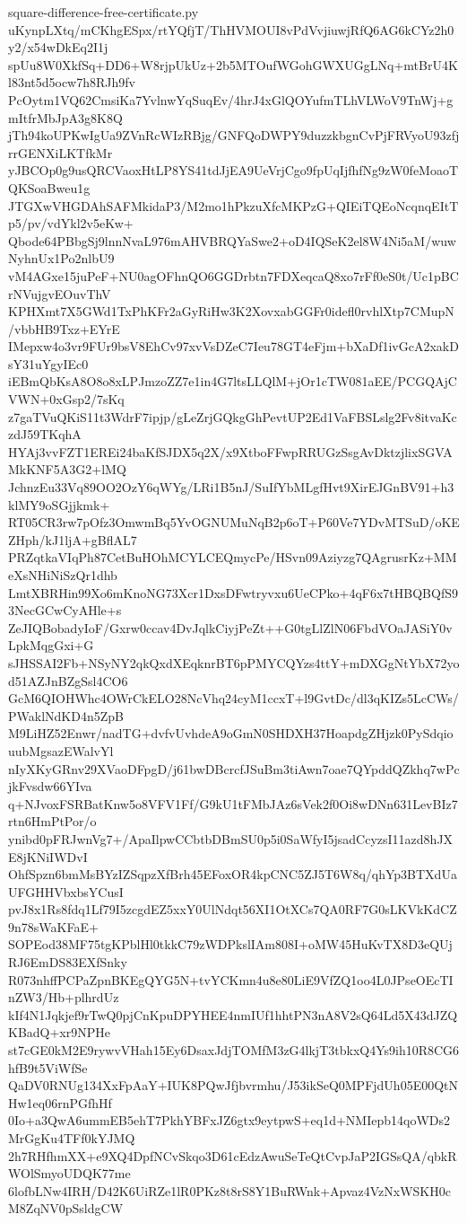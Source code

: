 \documentclass[11pt]{article}
\theoremstyle{definition}
\theoremstyle{remark}
\begin{document}
\begin{filecontents*}[overwrite]{square-difference-free-certificate.py}
uKynpLXtq/mCKhgESpx/rtYQfjT/ThHVMOUI8vPdVvjiuwjRfQ6AG6kCYz2h0y2/x54wDkEq2I1j
spUu8W0XkfSq+DD6+W8rjpUkUz+2b5MTOufWGohGWXUGgLNq+mtBrU4Kl83nt5d5ocw7h8RJh9fv
PcOytm1VQ62CmsiKa7YvlnwYqSuqEv/4hrJ4xGlQOYufmTLhVLWoV9TnWj+gmItfrMbJpA3g8K8Q
jTh94koUPKwIgUa9ZVnRcWIzRBjg/GNFQoDWPY9duzzkbgnCvPjFRVyoU93zfjrrGENXiLKTfkMr
yJBCOp0g9usQRCVaoxHtLP8YS41tdJjEA9UeVrjCgo9fpUqIjfhfNg9zW0feMoaoTQKSoaBweu1g
JTGXwVHGDAhSAFMkidaP3/M2mo1hPkzuXfcMKPzG+QIEiTQEoNcqnqEItTp5/pv/vdYkl2v5eKw+
Qbode64PBbgSj9lnnNvaL976mAHVBRQYaSwe2+oD4IQSeK2el8W4Ni5aM/wuwNyhnUx1Po2nlbU9
vM4AGxe15juPeF+NU0agOFhnQO6GGDrbtn7FDXeqcaQ8xo7rFf0eS0t/Uc1pBCrNVujgvEOuvThV
KPHXmt7X5GWd1TxPhKFr2aGyRiHw3K2XovxabGGFr0idefl0rvhlXtp7CMupN/vbbHB9Txz+EYrE
IMepxw4o3vr9FUr9bsV8EhCv97xvVsDZeC7Ieu78GT4eFjm+bXaDf1ivGcA2xakDsY31uYgyIEc0
iEBmQbKsA8O8o8xLPJmzoZZ7e1in4G7ltsLLQlM+jOr1cTW081aEE/PCGQAjCVWN+0xGsp2/7sKq
z7gaTVuQKiS11t3WdrF7ipjp/gLeZrjGQkgGhPevtUP2Ed1VaFBSLslg2Fv8itvaKczdJ59TKqhA
HYAj3vvFZT1EREi24baKfSJDX5q2X/x9XtboFFwpRRUGzSsgAvDktzjlixSGVAMkKNF5A3G2+lMQ
JchnzEu33Vq89OO2OzY6qWYg/LRi1B5nJ/SuIfYbMLgfHvt9XirEJGnBV91+h3klMY9oSGjjkmk+
RT05CR3rw7pOfz3OmwmBq5YvOGNUMuNqB2p6oT+P60Ve7YDvMTSuD/oKEZHph/kJ1ljA+gBflAL7
PRZqtkaVIqPh87CetBuHOhMCYLCEQmycPe/HSvn09Aziyzg7QAgrusrKz+MMeXsNHiNiSzQr1dhb
LmtXBRHin99Xo6mKnoNG73Xcr1DxsDFwtryvxu6UeCPko+4qF6x7tHBQBQfS93NecGCwCyAHle+s
ZeJIQBobadyIoF/Gxrw0ccav4DvJqlkCiyjPeZt++G0tgLlZlN06FbdVOaJASiY0vLpkMqgGxi+G
sJHSSAI2Fb+NSyNY2qkQxdXEqknrBT6pPMYCQYzs4ttY+mDXGgNtYbX72yod51AZJnBZgSsl4CO6
GcM6QIOHWhc4OWrCkELO28NcVhq24cyM1ccxT+l9GvtDc/dl3qKIZs5LcCWs/PWaklNdKD4n5ZpB
M9LiHZ52Enwr/nadTG+dvfvUvhdeA9oGmN0SHDXH37HoapdgZHjzk0PySdqiouubMgsazEWalvYl
nIyXKyGRnv29XVaoDFpgD/j61bwDBcrcfJSuBm3tiAwn7oae7QYpddQZkhq7wPcjkFvsdw66YIva
q+NJvoxFSRBatKnw5o8VFV1Ff/G9kU1tFMbJAz6sVek2f0Oi8wDNn631LevBIz7rtn6HmPtPor/o
ynibd0pFRJwnVg7+/ApaIlpwCCbtbDBmSU0p5i0SaWfyI5jsadCcyzsI11azd8hJXE8jKNiIWDvI
OhfSpzn6bmMsBYzIZSqpzXfBrh45EFoxOR4kpCNC5ZJ5T6W8q/qhYp3BTXdUaUFGHHVbxbsYCusI
pvJ8x1Rs8fdq1Lf79I5zcgdEZ5xxY0UlNdqt56XI1OtXCs7QA0RF7G0sLKVkKdCZ9n78sWaKFaE+
SOPEod38MF75tgKPblHl0tkkC79zWDPkslIAm808I+oMW45HuKvTX8D3eQUjRJ6EmDS83EXfSnky
R073nhffPCPaZpnBKEgQYG5N+tvYCKmn4u8e80LiE9VfZQ1oo4L0JPseOEcTInZW3/Hb+plhrdUz
kIf4N1Jqkjef9rTwQ0pjCnKpuDPYHEE4nmIUf1hhtPN3nA8V2sQ64Ld5X43dJZQKBadQ+xr9NPHe
st7cGE0kM2E9rywvVHah15Ey6DsaxJdjTOMfM3zG4lkjT3tbkxQ4Ys9ih10R8CG6hfB9t5ViWfSe
QaDV0RNUg134XxFpAaY+IUK8PQwJfjbvrmhu/J53ikSeQ0MPFjdUh05E00QtNHw1eq06rnPGfhHf
0Io+a3QwA6ummEB5ehT7PkhYBFxJZ6gtx9eytpwS+eq1d+NMIepb14qoWDs2MrGgKu4TFf0kYJMQ
2h7RHfhmXX+e9XQ4DpfNCvSkqo3D61cEdzAwuSeTeQtCvpJaP2IGSsQA/qbkRWOlSmyoUDQK77me
6lofbLNw4IRH/D42K6UiRZe1lR0PKz8t8rS8Y1BuRWnk+Apvaz4VzNxWSKH0cM8ZqNV0pSsldgCW

\end{filecontents*}
\end{document}
